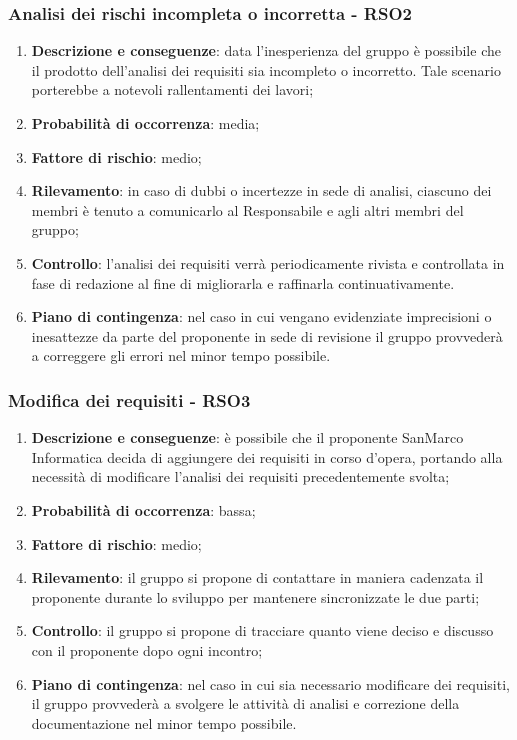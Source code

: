 	\subsubsection{Analisi dei rischi incompleta o incorretta - RSO2}
	\begin{enumerate}
		\item \textbf{Descrizione e conseguenze}: data l'inesperienza del gruppo è possibile che il prodotto dell'analisi dei requisiti sia incompleto o incorretto. Tale scenario porterebbe a notevoli rallentamenti dei lavori;
		\item \textbf{Probabilità di occorrenza}: media;
		\item \textbf{Fattore di rischio}: medio;
		\item \textbf{Rilevamento}: in caso di dubbi o incertezze in sede di analisi, ciascuno dei membri è tenuto a comunicarlo al Responsabile e agli altri membri del gruppo;		
		\item \textbf{Controllo}: l'analisi dei requisiti verrà periodicamente rivista e controllata in fase di redazione al fine di migliorarla e raffinarla continuativamente.
		\item \textbf{Piano di contingenza}: nel caso in cui vengano evidenziate imprecisioni o inesattezze da parte del proponente in sede di revisione il gruppo provvederà a correggere gli errori nel minor tempo possibile.
	\end{enumerate}
	
	\subsubsection{Modifica dei requisiti - RSO3}
	\begin{enumerate}
		\item \textbf{Descrizione e conseguenze}: è possibile che il proponente SanMarco Informatica decida di aggiungere dei requisiti in corso d'opera, portando alla necessità di modificare l'analisi dei requisiti precedentemente svolta; 
		\item \textbf{Probabilità di occorrenza}: bassa;
		\item \textbf{Fattore di rischio}: medio;
		\item \textbf{Rilevamento}: il gruppo si propone di contattare in maniera cadenzata il proponente durante lo sviluppo per mantenere sincronizzate le due parti;
		\item \textbf{Controllo}: il gruppo si propone di tracciare quanto viene deciso e discusso con il proponente dopo ogni incontro;
		\item \textbf{Piano di contingenza}: nel caso in cui sia necessario modificare dei requisiti, il gruppo provvederà a svolgere le attività di analisi e correzione della documentazione nel minor tempo possibile.
	\end{enumerate}	
	
